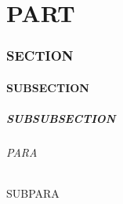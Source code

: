 \documentclass[UTF8,zihao=5]{ctexart} %
\begin{document}
\part{PART}

\section{SECTION}

\subsection{SUBSECTION}

\subsubsection{SUBSUBSECTION}

\paragraph{PARA}

\subparagraph{SUBPARA}
\end{document}
